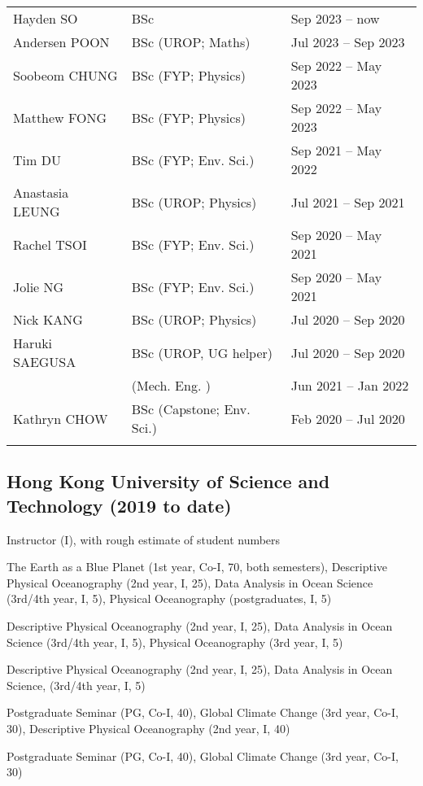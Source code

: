 \documentclass[letterpaper]{article}
\renewenvironment{itemize}{
  \begin{list}{}{
    \setlength{\leftmargin}{1.5em}
  }
}{
  \end{list}
}
\begin{document}
\begin{tabularx}{\textwidth}{XXX}
  Hayden SO               & BSc                   & Sep 2023 -- now\\
  Andersen POON           & BSc (UROP; Maths)     & Jul 2023 -- Sep 2023\\
  Soobeom CHUNG           & BSc (FYP; Physics)    & Sep 2022 -- May 2023\\
  Matthew FONG            & BSc (FYP; Physics)    & Sep 2022 -- May 2023\\
  Tim DU                  & BSc (FYP; Env. Sci.)  & Sep 2021 -- May 2022\\
  Anastasia LEUNG         & BSc (UROP; Physics)   & Jul 2021 -- Sep 2021\\
  Rachel TSOI             & BSc (FYP; Env. Sci.)  & Sep 2020 -- May 2021\\
  Jolie NG                & BSc (FYP; Env. Sci.)  & Sep 2020 -- May 2021\\
  Nick KANG               & BSc (UROP; Physics)   & Jul 2020 -- Sep 2020\\
  Haruki SAEGUSA          & BSc (UROP, UG helper) & Jul 2020 -- Sep 2020\\
                          &     (Mech. Eng.     ) & Jun 2021 -- Jan 2022\\
  Kathryn CHOW            & BSc (Capstone; Env. Sci.) & Feb 2020 -- Jul 2020\\
  \\
\end{tabularx}

\subsection*{Hong Kong University of Science and Technology (2019 to date)}
\begin{itemize}
\item Instructor (I), with rough estimate of student numbers
\begin{itemize}
  \item[23/24:] The Earth as a Blue Planet (1st year, Co-I, 70, both semesters),
  Descriptive Physical Oceanography (2nd year, I, 25), Data Analysis in Ocean
  Science (3rd/4th year, I, 5), Physical Oceanography (postgraduates, I, 5)
  \item[22/23:] Descriptive Physical Oceanography (2nd year, I, 25), Data
  Analysis in Ocean Science (3rd/4th year, I, 5), Physical Oceanography (3rd year, I, 5)
  \item[21/22:] Descriptive Physical Oceanography (2nd year, I, 25), Data
  Analysis in Ocean Science, (3rd/4th year, I, 5)
  \item[20/21:] Postgraduate Seminar (PG, Co-I, 40), Global Climate Change (3rd
  year, Co-I, 30), Descriptive Physical Oceanography (2nd year, I, 40)
  \item[19/20:] Postgraduate Seminar (PG, Co-I, 40), Global Climate Change (3rd
  year, Co-I, 30)
\end{itemize}
\end{itemize}
\end{document}
